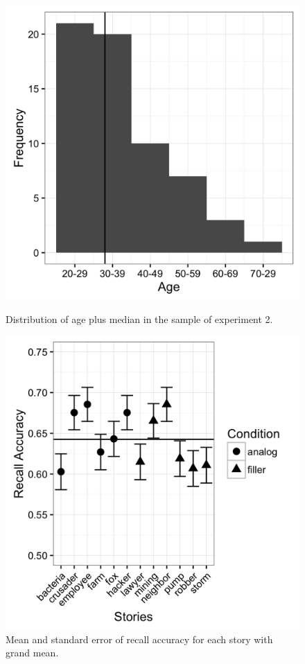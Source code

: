 \documentclass[a4paper,man,natbib,floatsintext,import]{apa6}
\begin{document}
\begin{figure}
\begin{minipage}[t]{.5\textwidth}
\includegraphics[width=.9\linewidth]{figures/sample2_age.png}
\caption{Distribution of age plus median in the sample of experiment 2.}
\label{fig:sample2_age}
\end{minipage}
\begin{minipage}[t]{.5\textwidth}
\includegraphics[width=.9\linewidth]{figures/material2_stories.png}
\caption{Mean and standard error of recall accuracy for each story with grand mean.}
\label{fig:material2_stories}
\end{minipage}
\end{figure}
\end{document}
